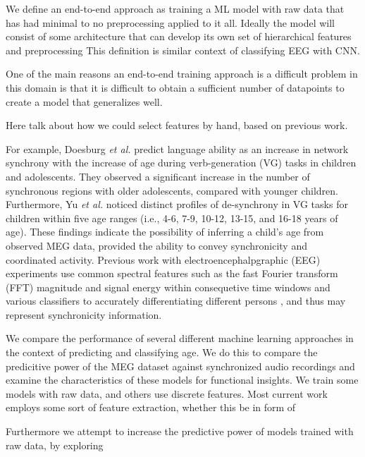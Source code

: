 \documentclass[utf8]{frontiersSCNS} %
\begin{document}
We define an end-to-end approach as training a ML model with raw data that has had minimal to no preprocessing applied to it all. Ideally the model will consist of some architecture that can develop its own set of hierarchical features and preprocessing   This definition is similar context of classifying EEG with CNN.

One of the main reasons an end-to-end training approach is a difficult problem in this domain is that it is difficult to obtain a sufficient number of datapoints to create a model that generalizes well.




Here talk about how we could select features by hand, based on previous work.

For example, Doesburg {\em et al.} \cite{Doesburg2016} predict language ability as an increase in network synchrony with the increase of age during verb-generation (VG) tasks in children and adolescents. They observed a significant increase in the number of synchronous regions with older adolescents, compared with younger children. Furthermore, Yu {\em et al.} \cite{Yu2014} noticed distinct profiles of de-synchrony in VG tasks for children within five age ranges (i.e., 4-6, 7-9, 10-12, 13-15, and 16-18 years of age). These findings indicate the possibility of inferring a child's age from observed MEG data, provided the ability to convey synchronicity and coordinated activity.
Previous work with electroencephalpgraphic (EEG) experiments use common spectral features such as the fast Fourier transform (FFT) magnitude and signal energy within consequetive time windows and various classifiers to accurately differentiating different persons \cite{Nguyen2012, Poulos2001}, and thus may represent synchronicity information.



We compare the performance of several different machine learning approaches in the context of predicting and classifying age. We do this to compare the predicitive power of the MEG dataset against synchronized audio recordings and examine the characteristics of these models for functional insights.
We train some models with raw data, and others use discrete features. Most current work employs some sort of feature extraction, whether this be in form of 

Furthermore we attempt to increase the predictive power of models trained with raw data, by exploring 
\end{document}
